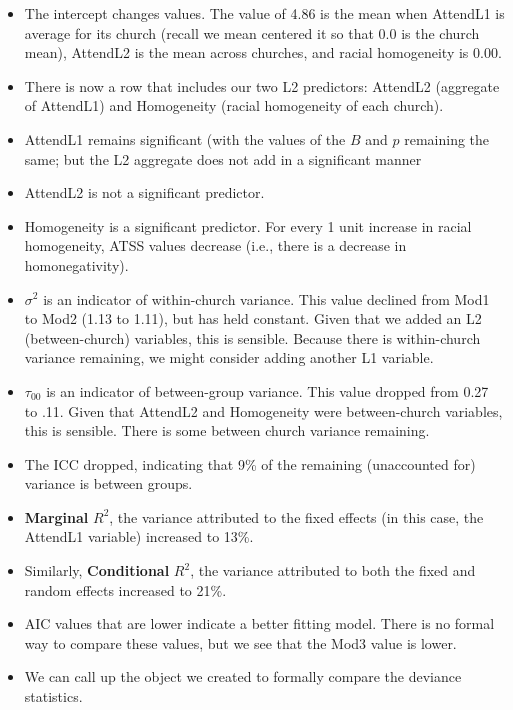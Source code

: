 \documentclass[
  english,
]{book}
\providecommand{\tightlist}{%
  \setlength{\itemsep}{0pt}\setlength{\parskip}{0pt}}
\begin{document}
\begin{itemize}
\tightlist
\item
  The intercept changes values. The value of 4.86 is the mean when AttendL1 is average for its church (recall we mean centered it so that 0.0 is the church mean), AttendL2 is the mean across churches, and racial homogeneity is 0.00.\\
\item
  There is now a row that includes our two L2 predictors: AttendL2 (aggregate of AttendL1) and Homogeneity (racial homogeneity of each church).
\item
  AttendL1 remains significant (with the values of the \(B\) and \(p\) remaining the same; but the L2 aggregate does not add in a significant manner
\item
  AttendL2 is not a significant predictor.
\item
  Homogeneity is a significant predictor. For every 1 unit increase in racial homogeneity, ATSS values decrease (i.e., there is a decrease in homonegativity).
\item
  \(\sigma^{2}\) is an indicator of within-church variance. This value declined from Mod1 to Mod2 (1.13 to 1.11), but has held constant. Given that we added an L2 (between-church) variables, this is sensible. Because there is within-church variance remaining, we might consider adding another L1 variable.
\item
  \(\tau _{00}\) is an indicator of between-group variance. This value dropped from 0.27 to .11. Given that AttendL2 and Homogeneity were between-church variables, this is sensible. There is some between church variance remaining.
\item
  The ICC dropped, indicating that 9\% of the remaining (unaccounted for) variance is between groups.
\item
  \textbf{Marginal} \(R^2\), the variance attributed to the fixed effects (in this case, the AttendL1 variable) increased to 13\%.
\item
  Similarly, \textbf{Conditional} \(R^2\), the variance attributed to both the fixed and random effects increased to 21\%.
\item
  AIC values that are lower indicate a better fitting model. There is no formal way to compare these values, but we see that the Mod3 value is lower.
\item
  We can call up the object we created to formally compare the deviance statistics.
\end{itemize}
\end{document}
